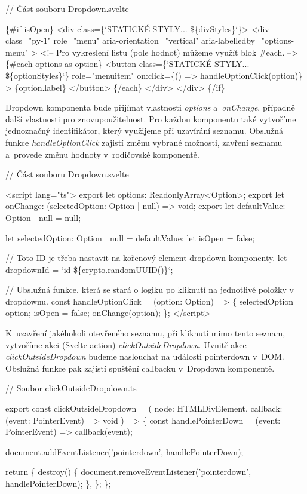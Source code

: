 \begin{prog}
// Část souboru Dropdown.svelte

\{#if isOpen\}
  <div class=\{`STATICKÉ STYLY... \$\{divStyles\}`\}>
    <div 
      class="py-1" role="menu" 
      aria-orientation="vertical" aria-labelledby="options-menu"
    >
      <!-- Pro vykreslení listu (pole hodnot) můžeme využít blok #each. -->
      \{#each options as option\}
        <button
          class=\{`STATICKÉ STYLY... \$\{optionStyles\}`\}
          role="menuitem"
          on:click=\{() => handleOptionClick(option)\}
        >
          \{option.label\}
        </button>
      \{/each\}
    </div>
  </div>
\{/if\}
\end{prog}

Dropdown komponenta bude přijímat vlastnosti \emph{options} a~\emph{onChange}, případně další vlastnosti pro znovupoužitelnost. Pro každou komponentu také vytvoříme jednoznačný identifikátor, který využijeme při uzavírání seznamu.
Obslužná funkce \emph{handleOptionClick} zajistí změnu vybrané možnosti, zavření seznamu a~provede změnu hodnoty v~rodičovské komponentě. 

\begin{prog}
// Část souboru Dropdown.svelte
  
<script lang="ts">
  export let options: ReadonlyArray<Option>;
  export let onChange: (selectedOption: Option | null) => void;
  export let defaultValue: Option | null = null;

  let selectedOption: Option | null = defaultValue;
  let isOpen = false;

  // Toto ID je třeba nastavit na kořenový element dropdown komponenty.
  let dropdownId = `id-\$\{crypto.randomUUID()\}`;

  // Ubslužná funkce, která se stará o logiku 
    po kliknutí na jednotlivé položky v dropdownu.
  const handleOptionClick = (option: Option) => \{
    selectedOption = option;
    isOpen = false;
    onChange(option);
  \};
</script>
\end{prog}

K~uzavření jakéhokoli otevřeného seznamu, při kliknutí mimo tento seznam, vytvoříme akci (Svelte action) \emph{clickOutsideDropdown}. 
Uvnitř akce \emph{clickOutsideDropdown} budeme naslouchat na události pointerdown v~DOM. Obslužná funkce pak zajistí spuštění callbacku v~Dropdown komponentě.

\begin{prog}
// Soubor clickOutsideDropdown.ts

export const clickOutsideDropdown = (
  node: HTMLDivElement,
  callback: (event: PointerEvent) => void
) => \{
  const handlePointerDown = (event: PointerEvent) => callback(event);

  document.addEventListener('pointerdown', handlePointerDown);

  return \{
    destroy() \{
      document.removeEventListener('pointerdown', handlePointerDown);
    \},
  \};
\};
\end{prog}

